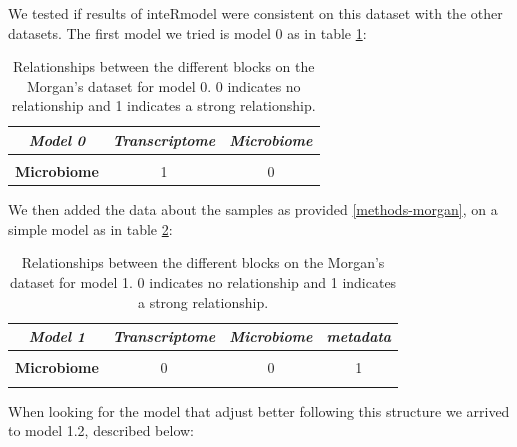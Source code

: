 \documentclass[
  12pt,
  a4paper,
  twoside,
  openright]{book}
\begin{document}
We tested if results of inteRmodel were consistent on this dataset with the other datasets.
The first model we tried is model 0 as in table \ref{tab:morgan-model0}:

\begin{table}[H]

\caption[Model 0 of Morgan's dataset.]{\label{tab:morgan-model0}Relationships between the different blocks on the Morgan's dataset for model 0. 0 indicates no relationship and 1 indicates a strong relationship.}
\centering
\begin{tabular}[t]{|>{}c|c|>{}c|}
\hline
\em{\textbf{Model 0}} & \em{\textbf{Transcriptome}} & \em{\textbf{Microbiome}}\\
\hline
\textbf{\cellcolor{gray!6}{Transcriptome}} & \cellcolor{gray!6}{0} & \cellcolor{gray!6}{1}\\
\hline
\textbf{Microbiome} & 1 & 0\\
\hline
\end{tabular}
\end{table}

We then added the data about the samples as provided \ref{methods-morgan}, on a simple model as in table \ref{tab:morgan-model1}:

\begin{table}[H]

\caption[Model 1 of Morgan's dataset.]{\label{tab:morgan-model1}Relationships between the different blocks on the Morgan's dataset for model 1. 0 indicates no relationship and 1 indicates a strong relationship.}
\centering
\begin{tabular}[t]{|>{}c|c|c|>{}c|}
\hline
\em{\textbf{Model 1}} & \em{\textbf{Transcriptome}} & \em{\textbf{Microbiome}} & \em{\textbf{metadata}}\\
\hline
\textbf{\cellcolor{gray!6}{Transcriptome}} & \cellcolor{gray!6}{0} & \cellcolor{gray!6}{0} & \cellcolor{gray!6}{1}\\
\hline
\textbf{Microbiome} & 0 & 0 & 1\\
\hline
\textbf{\cellcolor{gray!6}{metadata}} & \cellcolor{gray!6}{1} & \cellcolor{gray!6}{1} & \cellcolor{gray!6}{0}\\
\hline
\end{tabular}
\end{table}

When looking for the model that adjust better following this structure we arrived to model 1.2, described below:
\end{document}
